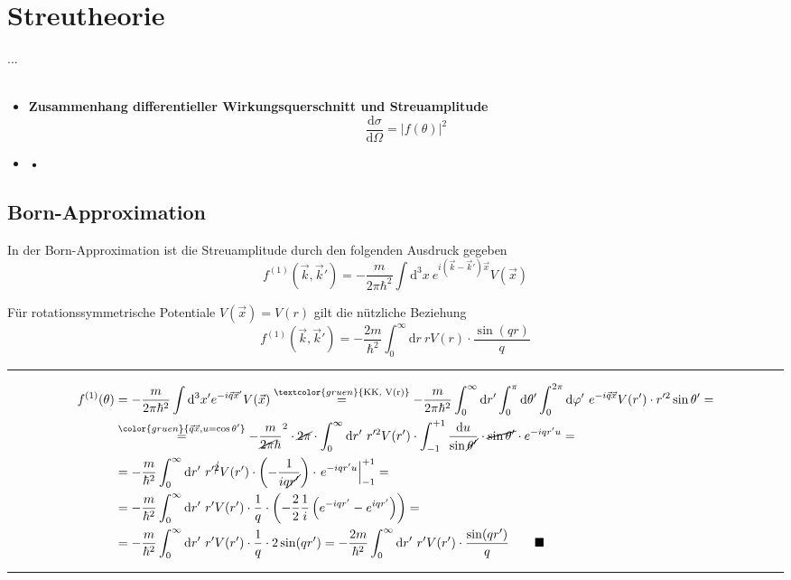\documentclass{article}
\newcommand{\diff}{\mathrm{d}}
\newcommand{\lr}[1]{\left(#1\right)}
\newcommand{\commenttext}[1]{\textcolor{gruen}{\text{#1}}}
\newcommand{\comment}[1]{{\color{gruen} {#1}}}
\begin{document}
\newpage


\section{Streutheorie}
...\\
\\
	\begin{itemize}
		\item \textbf{Zusammenhang differentieller Wirkungsquerschnitt und Streuamplitude}
			\begin{equation}
				\frac{\diff\sigma}{\diff\Omega} = |f(\theta)|^2
			\end{equation}


		\item \textbf{•}
	\end{itemize}


\newpage


\subsection{Born-Approximation}
In der Born-Approximation ist die Streuamplitude durch den folgenden Ausdruck gegeben
 	\begin{equation}
 		f^{(1)}(\vec{k},\vec{k}') = -\frac{m}{2\pi\hbar^2}\int \diff^3x\ e^{i(\vec{k}-\vec{k}')\vec{x}} V(\vec{x})
 	\end{equation}
 		
Für rotationssymmetrische Potentiale $V(\vec{x}) = V(r)$ gilt die nützliche Beziehung
	\begin{equation}
		f^{(1)}(\vec{k},\vec{k}') = -\frac{2m}{\hbar^2} \int_0^\infty \diff r\ r V(r)\cdot  \frac{\sin(qr)}{q}
	\end{equation}

\vspace{0.5cm}

{\color{violet}
\hrule
		\begin{align*}
			f^{(1)}(\theta) &= - \frac{m}{2\pi\hbar^2} \int \diff^3x' e^{-i\vec{q}\vec{x}'} V(\vec{x}) \stackrel{\commenttext{KK, V(r)}}{=} -\frac{m}{2\pi\hbar^2} \int_0^\infty \diff r' \int_0^\pi \diff\theta' \int_0^{2\pi} \diff\varphi'\ e^{-i\vec{q}\vec{x}} V(r') \cdot r'^2\sin\theta' = \\
			&\stackrel{\comment{\vec{q}\vec{x}, u = \cos\theta'}}{=} -\frac{m}{\cancel{2\pi}\hbar}^2 \cdot \cancel{2\pi} \cdot \int_0^\infty \diff r'\ r'^2 V(r') \cdot \int_{-1}^{+1} \frac{\diff u}{\sin\cancel{\theta'}} \cdot \cancel{\sin\theta'} \cdot e^{-iqr' u} = \\
			&= -\frac{m}{\hbar^2} \int_0^\infty \diff r'\ r'^{\cancel{2}} V(r') \cdot \lr{-\frac{1}{iq\cancel{r'}}} \cdot \left.e^{-iqr' u}\right|_{-1}^{+1} = \\
			&= -\frac{m}{\hbar^2} \int_0^\infty \diff r'\ r' V(r') \cdot \frac{1}{q} \cdot \lr{-\frac{2}{2}\frac{1}{i}\lr{ e^{-iqr'} - e^{iqr'} }} = \\
			&= -\frac{m}{\hbar^2} \int_0^\infty \diff r'\ r' V(r') \cdot \frac{1}{q} \cdot 2\sin(qr') = -\frac{2m}{\hbar^2} \int_0^\infty \diff r'\ r' V(r') \cdot \frac{\sin(qr')}{q} \qquad\blacksquare
		\end{align*}
\hrule
}
\end{document}
